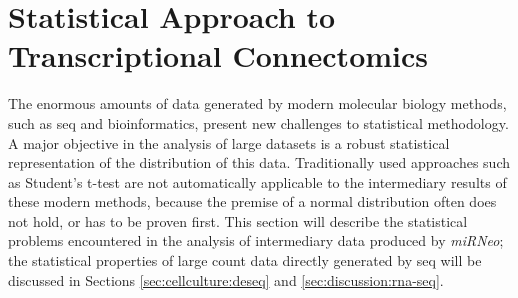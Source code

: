 \section{Statistical Approach to Transcriptional Connectomics}
The enormous amounts of data generated by modern molecular biology methods, such as \ac{seq} and bioinformatics, present new challenges to statistical methodology. A major objective in the analysis of large datasets is a robust statistical representation of the distribution of this data. Traditionally used approaches such as Student's t-test are not automatically applicable to the intermediary results of these modern methods, because the premise of a normal distribution often does not hold, or has to be proven first. This section will describe the statistical problems encountered in the analysis of intermediary data produced by \textit{miRNeo}; the statistical properties of large count data directly generated by \ac{seq} will be discussed in Sections \ref{sec:cellculture:deseq} and \ref{sec:discussion:rna-seq}.

